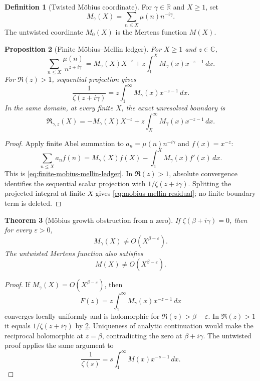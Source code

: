 \documentclass[11pt,a4paper]{article}
\newtheorem{theorem}{Theorem}[section]
\newtheorem{proposition}[theorem]{Proposition}
\theoremstyle{definition}
\newtheorem{definition}[theorem]{Definition}
\newcommand{\C}{\mathbb{C}}
\newcommand{\Residual}{\mathfrak{R}}
\begin{document}
\begin{definition}[Twisted Möbius coordinate]
\label{def:twisted-mobius-coordinate}
For $\gamma\in\mathbb R$ and $X\geq1$, set
\[
  M_\gamma(X)=\sum_{n\leq X}\mu(n)n^{-i\gamma}.
\]
The untwisted coordinate $M_0(X)$ is the Mertens function $M(X)$.
\end{definition}

\begin{proposition}[Finite Möbius--Mellin ledger]
\label{prop:finite-mobius-mellin-ledger}
For $X\geq1$ and $z\in\C$,
\begin{equation}
\label{eq:finite-mobius-mellin-ledger}
  \sum_{n\leq X}\frac{\mu(n)}{n^{z+i\gamma}}
  =
  M_\gamma(X)X^{-z}
  +z\int_1^X M_\gamma(x)x^{-z-1}\,dx.
\end{equation}
For $\Re(z)>1$, sequential projection gives
\[
  \frac1{\zeta(z+i\gamma)}
  =
  z\int_1^\infty M_\gamma(x)x^{-z-1}\,dx.
\]
In the same domain, at every finite $X$, the exact unresolved boundary is
\begin{equation}
\label{eq:mobius-mellin-residual}
  \Residual_{\gamma,z}(X)
  =
  -M_\gamma(X)X^{-z}
  +z\int_X^\infty M_\gamma(x)x^{-z-1}\,dx.
\end{equation}
\end{proposition}

\begin{proof}
Apply finite Abel summation to
$a_n=\mu(n)n^{-i\gamma}$ and $f(x)=x^{-z}$:
\[
  \sum_{n\leq X}a_nf(n)
  =M_\gamma(X)f(X)-\int_1^XM_\gamma(x)f'(x)\,dx.
\]
This is \cref{eq:finite-mobius-mellin-ledger}. In $\Re(z)>1$, absolute
convergence identifies the sequential scalar projection with
$1/\zeta(z+i\gamma)$. Splitting the projected integral at finite $X$ gives
\cref{eq:mobius-mellin-residual}; no finite boundary term is deleted.
\end{proof}

\begin{theorem}[Möbius growth obstruction from a zero]
\label{thm:mobius-growth-obstruction}
If $\zeta(\beta+i\gamma)=0$, then for every $\varepsilon>0$,
\begin{equation}
\label{eq:twisted-growth-obstruction}
  M_\gamma(X)\neq O\!\left(X^{\beta-\varepsilon}\right).
\end{equation}
The untwisted Mertens function also satisfies
\[
  M(X)\neq O\!\left(X^{\beta-\varepsilon}\right).
\]
\end{theorem}

\begin{proof}
If $M_\gamma(X)=O(X^{\beta-\varepsilon})$, then
\[
  F(z)=z\int_1^\infty M_\gamma(x)x^{-z-1}\,dx
\]
converges locally uniformly and is holomorphic for
$\Re(z)>\beta-\varepsilon$. In $\Re(z)>1$ it equals
$1/\zeta(z+i\gamma)$ by
\cref{prop:finite-mobius-mellin-ledger}. Uniqueness of analytic continuation
would make the reciprocal holomorphic at $z=\beta$, contradicting the zero at
$\beta+i\gamma$. The untwisted proof applies the same argument to
\[
  \frac1{\zeta(s)}
  =s\int_1^\infty M(x)x^{-s-1}\,dx.
\]
\end{proof}
\end{document}
